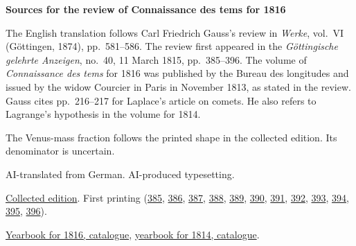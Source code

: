 \clearpage\thispagestyle{empty}
\begin{center}\Large\bfseries Sources for the review of Connaissance des tems for 1816\end{center}

The English translation follows Carl Friedrich Gauss's review in \emph{Werke}, vol.~VI (Göttingen, 1874), pp.~581--586. The review first appeared in the \emph{Göttingische gelehrte Anzeigen}, no.~40, 11 March 1815, pp.~385--396. The volume of \emph{Connaissance des tems} for 1816 was published by the Bureau des longitudes and issued by the widow Courcier in Paris in November 1813, as stated in the review. Gauss cites pp.~216--217 for Laplace's article on comets. He also refers to Lagrange's hypothesis in the volume for 1814.

The Venus-mass fraction follows the printed shape in the collected edition. Its denominator is uncertain.

AI-translated from German. AI-produced typesetting.

\href{https://gdz.sub.uni-goettingen.de/id/PPN236007467}{Collected edition}. First printing (\href{https://images.p.sub.uni-goettingen.de/iiif/image/gdz:PPN319721507_1815:00000389/full/1650,/0/default.jpg}{385}, \href{https://images.p.sub.uni-goettingen.de/iiif/image/gdz:PPN319721507_1815:00000390/full/1650,/0/default.jpg}{386}, \href{https://images.p.sub.uni-goettingen.de/iiif/image/gdz:PPN319721507_1815:00000391/full/1650,/0/default.jpg}{387}, \href{https://images.p.sub.uni-goettingen.de/iiif/image/gdz:PPN319721507_1815:00000392/full/1650,/0/default.jpg}{388}, \href{https://images.p.sub.uni-goettingen.de/iiif/image/gdz:PPN319721507_1815:00000393/full/1650,/0/default.jpg}{389}, \href{https://images.p.sub.uni-goettingen.de/iiif/image/gdz:PPN319721507_1815:00000394/full/1650,/0/default.jpg}{390}, \href{https://images.p.sub.uni-goettingen.de/iiif/image/gdz:PPN319721507_1815:00000395/full/1650,/0/default.jpg}{391}, \href{https://images.p.sub.uni-goettingen.de/iiif/image/gdz:PPN319721507_1815:00000396/full/1650,/0/default.jpg}{392}, \href{https://images.p.sub.uni-goettingen.de/iiif/image/gdz:PPN319721507_1815:00000397/full/1650,/0/default.jpg}{393}, \href{https://images.p.sub.uni-goettingen.de/iiif/image/gdz:PPN319721507_1815:00000398/full/1650,/0/default.jpg}{394}, \href{https://images.p.sub.uni-goettingen.de/iiif/image/gdz:PPN319721507_1815:00000399/full/1650,/0/default.jpg}{395}, \href{https://images.p.sub.uni-goettingen.de/iiif/image/gdz:PPN319721507_1815:00000400/full/1650,/0/default.jpg}{396}).

\href{https://cdt.imcce.fr/items/show/165}{Yearbook for 1816, catalogue}, \href{https://cdt.imcce.fr/items/show/163}{yearbook for 1814, catalogue}.

\clearpage
